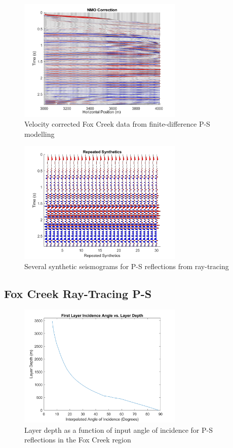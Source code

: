 \documentclass[12pt]{article}
\begin{document}
\begin{figure}[!htb]
	\centering
	\includegraphics[width=0.7\textwidth]{Figures/FDCnmo.png}
	\caption[Fox Creek finite-difference P-S NMO correction]{Velocity corrected Fox Creek data from finite-difference P-S modelling}
	\label{fig:FDCnmo}
\end{figure}	

\begin{figure}[!htb]
	\centering
	\includegraphics[width=0.7\textwidth]{Figures/FDCseveralstack.png}
	\caption[Fox Creek ray-tracing several P-S synthetic seismograms]{Several synthetic seismograms for P-S reflections from ray-tracing}
	\label{fig:FDCSeveralStack}
\end{figure}
\FloatBarrier
\pagebreak
\subsection{Fox Creek Ray-Tracing P-S}
\begin{figure}[!htb]
	\centering
	\includegraphics[width=0.7\textwidth]{Figures/RTCDv.png}
	\caption[Fox Creek ray-tracing P-S depth-angle plot]{Layer depth as a function of input angle of incidence for P-S reflections in the Fox Creek region}
	\label{fig:RTCDv}
\end{figure}
\end{document}
